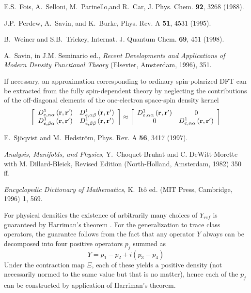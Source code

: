 \begin{references}
 E.S.~Fois, A.~Selloni, M.~Parinello,and R.~Car, J. Phys.
Chem. {\bf 92}, 3268 (1988).

 J.P.~Perdew, A.~Savin, and K.~Burke, Phys. Rev. A {\bf %
51}, 4531 (1995).

 B.~Weiner and S.B.~Trickey, Internat. J. Quantum Chem. 
{\bf 69}, 451 (1998).

 A.~Savin, in J.M. Seminario ed., {\it Recent
Developments and Applications of Modern Density Functional Theory}
(Elsevier, Amsterdam, 1996), 351.

 If necessary, an approximation corresponding to ordinary
spin-polarized DFT can be extracted from the fully spin-dependent theory by
neglecting the contributions of the off-diagonal elements of the
one-electron space-spin density kernel 
\begin{equation}
\left[ 
\begin{array}{cc}
D_{e,\alpha \alpha }^{1}\left( {\bf r,r}^{\prime }\right) & D_{e,\alpha
\beta }^{1}\left( {\bf r,r}^{\prime }\right) \\ 
D_{e,\beta \alpha }^{1}\left( {\bf r,r}^{\prime }\right) & D_{e,\beta \beta
}^{1}\left( {\bf r,r}^{\prime }\right)%
\end{array}%
\right] \approx \left[ 
\begin{array}{cc}
D_{e,\alpha \alpha }^{1}\left( {\bf r,r}^{\prime }\right) & 0 \\ 
0 & D_{e,\alpha \alpha }^{1}\left( {\bf r,r}^{\prime }\right)%
\end{array}%
\right]  \nonumber
\end{equation}

 E.~Sj\"oqvist and M.~Hedstr\"om, Phys. Rev. A {\bf 56},
3417 (1997).

 {\it Analysis, Manifolds, and Physics}, Y.~Choquet-Bruhat
and C. DeWitt-Morette with M. Dillard-Bleick, Revised Edition
(North-Holland, Amsterdam, 1982) 350 ff.

 {\it Encyclopedic Dictionary of Mathematics},
K.~It\^o ed. (MIT Press, Cambridge, 1996) {\bf 1}, 569.

 For physical densities the existence of arbitrarily many
choices of $Y_{ref}$ is guaranteed by Harriman's theorem \cite{Harriman81}.
For the generalization to trace class operators, the guarantee follows from
the fact that any operator $Y$ always can be decomposed into four positive
operators $p_{j}$ summed as 
\[
Y=p_{1}-p_{2}+i(p_{3}-p_{4}) 
\]%
Under the contraction map $\Xi $, each of these yields a positive density
(not necessarily normed to the same value but that is no matter), hence each
of the $p_{j}$ can be constructed by application of Harriman's theorem.


\end{references}
